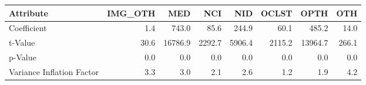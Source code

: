 \begin{tabular}{lrrrrrrr}
\toprule
Attribute &  IMG\_OTH &      MED &     NCI &     NID &   OCLST &     OPTH &    OTH \\
\midrule
Coefficient               &      1.4 &    743.0 &    85.6 &   244.9 &    60.1 &    485.2 &   14.0 \\
t-Value                   &     30.6 &  16786.9 &  2292.7 &  5906.4 &  2115.2 &  13964.7 &  266.1 \\
p-Value                   &      0.0 &      0.0 &     0.0 &     0.0 &     0.0 &      0.0 &    0.0 \\
Variance Inflation Factor &      3.3 &      3.0 &     2.1 &     2.6 &     1.2 &      1.9 &    4.2 \\
\bottomrule
\end{tabular}
